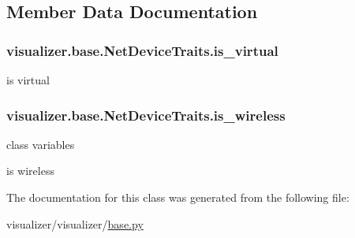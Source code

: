 \subsection{Member Data Documentation}
\subsubsection[{\texorpdfstring{is\+\_\+virtual}{is_virtual}}]{\setlength{\rightskip}{0pt plus 5cm}visualizer.\+base.\+Net\+Device\+Traits.\+is\+\_\+virtual}\hypertarget{classvisualizer_1_1base_1_1NetDeviceTraits_acaac18d58139cf512544a293f64cad0a}{}\label{classvisualizer_1_1base_1_1NetDeviceTraits_acaac18d58139cf512544a293f64cad0a}


is virtual 

\subsubsection[{\texorpdfstring{is\+\_\+wireless}{is_wireless}}]{\setlength{\rightskip}{0pt plus 5cm}visualizer.\+base.\+Net\+Device\+Traits.\+is\+\_\+wireless}\hypertarget{classvisualizer_1_1base_1_1NetDeviceTraits_ab47e1d82868ef9c5c04b4fba6060b903}{}\label{classvisualizer_1_1base_1_1NetDeviceTraits_ab47e1d82868ef9c5c04b4fba6060b903}


class variables

is wireless 



The documentation for this class was generated from the following file\+:\begin{DoxyCompactItemize}
\item 
visualizer/visualizer/\hyperlink{base_8py}{base.\+py}\end{DoxyCompactItemize}

